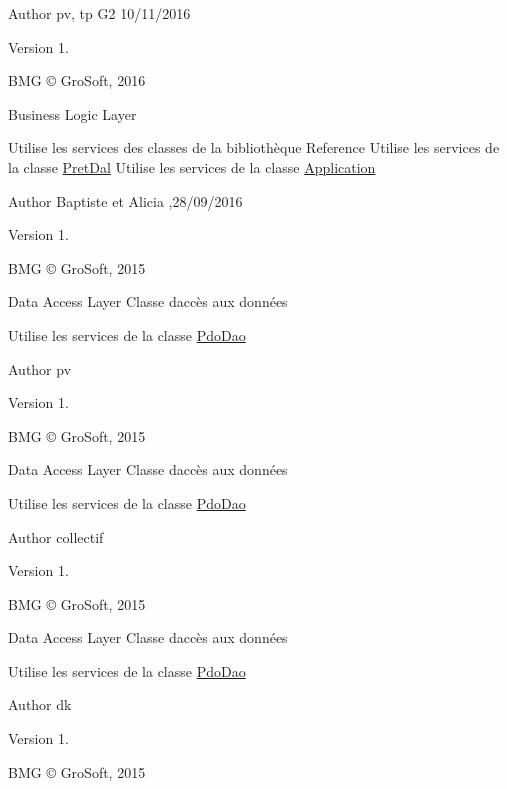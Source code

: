 \begin{DoxyAuthor}{Author}
pv, tp G2 10/11/2016 
\end{DoxyAuthor}
\begin{DoxyVersion}{Version}
1.
\end{DoxyVersion}
B\+MG © Gro\+Soft, 2016

Business Logic Layer

Utilise les services des classes de la bibliothèque Reference Utilise les services de la classe \hyperlink{class_pret_dal}{Pret\+Dal} Utilise les services de la classe \hyperlink{class_application}{Application}

\begin{DoxyAuthor}{Author}
Baptiste et Alicia ,28/09/2016 
\end{DoxyAuthor}
\begin{DoxyVersion}{Version}
1.
\end{DoxyVersion}
B\+MG © Gro\+Soft, 2015

Data Access Layer Classe d\textquotesingle{}accès aux données

Utilise les services de la classe \hyperlink{class_pdo_dao}{Pdo\+Dao}

\begin{DoxyAuthor}{Author}
pv 
\end{DoxyAuthor}
\begin{DoxyVersion}{Version}
1.
\end{DoxyVersion}
B\+MG © Gro\+Soft, 2015

Data Access Layer Classe d\textquotesingle{}accès aux données

Utilise les services de la classe \hyperlink{class_pdo_dao}{Pdo\+Dao}

\begin{DoxyAuthor}{Author}
collectif 
\end{DoxyAuthor}
\begin{DoxyVersion}{Version}
1.
\end{DoxyVersion}
B\+MG © Gro\+Soft, 2015

Data Access Layer Classe d\textquotesingle{}accès aux données

Utilise les services de la classe \hyperlink{class_pdo_dao}{Pdo\+Dao}

\begin{DoxyAuthor}{Author}
dk 
\end{DoxyAuthor}
\begin{DoxyVersion}{Version}
1.
\end{DoxyVersion}
B\+MG © Gro\+Soft, 2015

